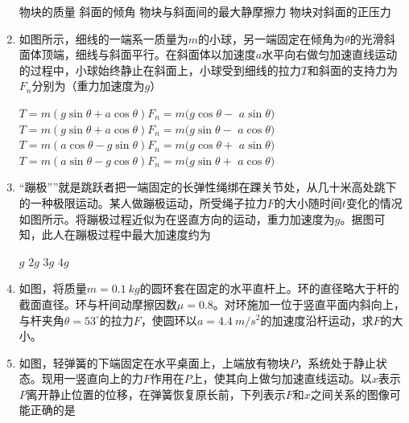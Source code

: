 \begin{enumerate}[leftmargin=0em]
\fourchoices
{物块的质量 }
{斜面的倾角}
{物块与斜面间的最大静摩擦力}
{物块对斜面的正压力}


\item 
{}
如图所示，细线的一端系一质量为$ m $的小球，另一端固定在倾角为$ \theta $的光滑斜面体顶端，细线与斜面平行。在斜面体以加速度$ a $水平向右做匀加速直线运动的过程中，小球始终静止在斜面上，小球受到细线的拉力$ T $和斜面的支持力为$ F_n $分别为（重力加速度为$ g $）  
\begin{figure}[h!]
\centering

\end{figure}


\fourchoices
{$ T=m(g \sin \theta + a \cos \theta ) F_n= m(g \cos \theta - $ $ a \sin \theta ) $}
{$ T=m(g \sin \theta + a \cos \theta ) F_n= m(g \sin \theta - $ $ a \cos \theta ) $}
{$ T=m(a \cos \theta - g \sin \theta ) F_n= m(g \cos \theta + $ $ a \sin \theta ) $}
{$ T=m(a \sin \theta - g \cos \theta ) F_n= m(g \sin \theta + $ $ a \cos \theta ) $}

\item 
{}
“蹦极””就是跳跃者把一端固定的长弹性绳绑在踝关节处，从几十米高处跳下的一种极限运动。某人做蹦极运动，所受绳子拉力$ F $的大小随时间$ t $变化的情况如图所示。将蹦极过程近似为在竖直方向的运动，重力加速度为$ g $。据图可知，此人在蹦极过程中最大加速度约为  
\begin{figure}[h!]
\centering

\end{figure}


\fourchoices
{$ g $ }
{$ 2g $}
{$ 3g $ }
{$ 4g $}

\item 
{}
如图，将质量$ m=0.1 \ kg $的圆环套在固定的水平直杆上。环的直径略大于杆的截面直径。环与杆间动摩擦因数$ \mu =0.8 $。对环施加一位于竖直平面内斜向上，与杆夹角$ \theta =53 ^{ \circ } $的拉力$ F $，使圆环以$ a=4.4 \ m/s ^{2} $的加速度沿杆运动，求$ F $的大小。
\begin{figure}[h!]
\flushright 

\end{figure}




\newpage


\item 
{}
如图，轻弹簧的下端固定在水平桌面上，上端放有物块$ P $，系统处于静止状态。现用一竖直向上的力$ F $作用在$ P $上，使其向上做匀加速直线运动。以$ x $表示$ P $离开静止位置的位移，在弹簧恢复原长前，下列表示$ F $和$ x $之间关系的图像可能正确的是  
\begin{figure}[h!]
\centering
 \quad 

\end{figure}




\end{enumerate}
